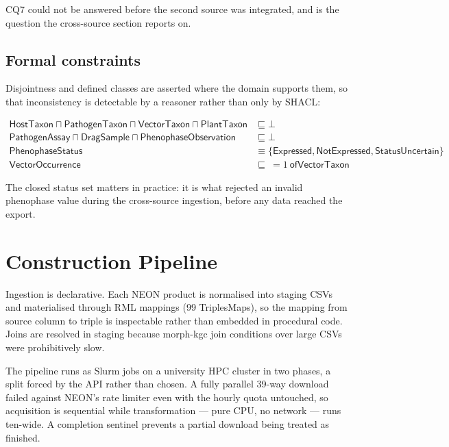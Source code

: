 CQ7 could not be answered before the second source was integrated, and is the
question the cross-source section reports on.

\subsection{Formal constraints}

Disjointness and defined classes are asserted where the domain supports them,
so that inconsistency is detectable by a reasoner rather than only by SHACL:

\begin{align*}
\mathsf{HostTaxon} \sqcap \mathsf{PathogenTaxon} \sqcap
  \mathsf{VectorTaxon} \sqcap \mathsf{PlantTaxon} &\sqsubseteq \bot \\
\mathsf{PathogenAssay} \sqcap \mathsf{DragSample} \sqcap
  \mathsf{PhenophaseObservation} &\sqsubseteq \bot \\
\mathsf{PhenophaseStatus} &\equiv \{\mathsf{Expressed},
  \mathsf{NotExpressed}, \mathsf{StatusUncertain}\} \\
\mathsf{VectorOccurrence} &\sqsubseteq\ =\!1\ \mathsf{ofVectorTaxon}
\end{align*}

\noindent
The closed status set matters in practice: it is what rejected an invalid
phenophase value during the cross-source ingestion, before any data reached the
export.

\section{Construction Pipeline}

Ingestion is declarative. Each NEON product is normalised into staging CSVs and
materialised through RML mappings (99 TriplesMaps), so the mapping from source
column to triple is inspectable rather than embedded in procedural code. Joins
are resolved in staging because morph-kgc join conditions over large CSVs were
prohibitively slow.

The pipeline runs as Slurm jobs on a university HPC cluster in two phases, a
split forced by the API rather than chosen. A fully parallel 39-way download
failed against NEON's rate limiter even with the hourly quota untouched, so
acquisition is sequential while transformation --- pure CPU, no network --- runs
ten-wide. A completion sentinel prevents a partial download being treated as
finished.

